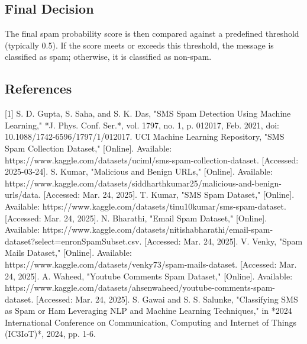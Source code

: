 \documentclass{article}
\begin{document}
\subsection{Final Decision}

The final spam probability score is then compared against a predefined threshold (typically 0.5). If the score meets or exceeds this threshold, the message is classified as spam; otherwise, it is classified as non-spam.

\newpage

\noindent


\subsection*{References}

[1] S. D. Gupta, S. Saha, and S. K. Das, "SMS Spam Detection Using Machine Learning," *J. Phys. Conf. Ser.*, vol. 1797, no. 1, p. 012017, Feb. 2021, doi: 10.1088/1742-6596/1797/1/012017.
\newline
\newline
[2] UCI Machine Learning Repository, "SMS Spam Collection Dataset," [Online]. Available: https://www.kaggle.com/datasets/uciml/sms-spam-collection-dataset. [Accessed: 2025-03-24].
\newline
\newline
[3] S. Kumar, "Malicious and Benign URLs," [Online]. Available: https://www.kaggle.com/datasets/siddharthkumar25/malicious-and-benign-urls/data. [Accessed: Mar. 24, 2025].
\newline
\newline
[4] T. Kumar, "SMS Spam Dataset," [Online]. Available: https://www.kaggle.com/datasets/tinu10kumar/sms-spam-dataset. [Accessed: Mar. 24, 2025].
\newline
\newline
[5] N. Bharathi, "Email Spam Dataset," [Online]. Available: https://www.kaggle.com/datasets/nitishabharathi/email-spam-dataset?select=enronSpamSubset.csv. [Accessed: Mar. 24, 2025].
\newline
\newline
[6] V. Venky, "Spam Mails Dataset," [Online]. Available: https://www.kaggle.com/datasets/venky73/spam-mails-dataset. [Accessed: Mar. 24, 2025].
\newline
\newline
[7] A. Waheed, "Youtube Comments Spam Dataset," [Online]. Available: https://www.kaggle.com/datasets/ahsenwaheed/youtube-comments-spam-dataset. [Accessed: Mar. 24, 2025].
\newline
\newline
[8] S. Gawai and S. S. Salunke, "Classifying SMS as Spam or Ham Leveraging NLP and Machine Learning Techniques," in *2024 International Conference on Communication, Computing and Internet of Things (IC3IoT)*, 2024, pp. 1-6.

\newpage
\end{document}
